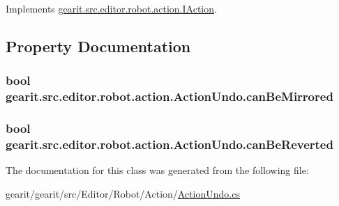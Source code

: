 Implements \hyperlink{interfacegearit_1_1src_1_1editor_1_1robot_1_1action_1_1_i_action_a8a84360c15fcd7d0f60ff7aef2dca980}{gearit.\+src.\+editor.\+robot.\+action.\+I\+Action}.



\subsection{Property Documentation}
\hypertarget{classgearit_1_1src_1_1editor_1_1robot_1_1action_1_1_action_undo_a1212463debcb9973f4356a10829bf38b}{
\subsubsection[{can\+Be\+Mirrored}]{\setlength{\rightskip}{0pt plus 5cm}bool gearit.\+src.\+editor.\+robot.\+action.\+Action\+Undo.\+can\+Be\+Mirrored\hspace{0.3cm}{\ttfamily [get]}}}\label{classgearit_1_1src_1_1editor_1_1robot_1_1action_1_1_action_undo_a1212463debcb9973f4356a10829bf38b}
\hypertarget{classgearit_1_1src_1_1editor_1_1robot_1_1action_1_1_action_undo_ae218328216db4bd4db4eff6c4695b312}{
\subsubsection[{can\+Be\+Reverted}]{\setlength{\rightskip}{0pt plus 5cm}bool gearit.\+src.\+editor.\+robot.\+action.\+Action\+Undo.\+can\+Be\+Reverted\hspace{0.3cm}{\ttfamily [get]}}}\label{classgearit_1_1src_1_1editor_1_1robot_1_1action_1_1_action_undo_ae218328216db4bd4db4eff6c4695b312}


The documentation for this class was generated from the following file\+:\begin{DoxyCompactItemize}
\item 
gearit/gearit/src/\+Editor/\+Robot/\+Action/\hyperlink{_robot_2_action_2_action_undo_8cs}{Action\+Undo.\+cs}\end{DoxyCompactItemize}
